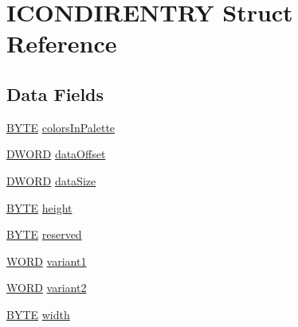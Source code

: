 \hypertarget{struct_i_c_o_n_d_i_r_e_n_t_r_y}{\section{I\-C\-O\-N\-D\-I\-R\-E\-N\-T\-R\-Y Struct Reference}
\label{struct_i_c_o_n_d_i_r_e_n_t_r_y}
}
\subsection*{Data Fields}
\begin{DoxyCompactItemize}
\item 
\hyperlink{il__bmp_8c_ab1926a007088a95f3b4f8b9baf01743f}{B\-Y\-T\-E} \hyperlink{struct_i_c_o_n_d_i_r_e_n_t_r_y_a4f291ed34428ce7b514486c736a6ae91}{colors\-In\-Palette}
\item 
\hyperlink{il__bmp_8c_a3f4629c2670b222c5d739cae794db89f}{D\-W\-O\-R\-D} \hyperlink{struct_i_c_o_n_d_i_r_e_n_t_r_y_accd9fd9f06d89d6a3a6a3a868f2d6096}{data\-Offset}
\item 
\hyperlink{il__bmp_8c_a3f4629c2670b222c5d739cae794db89f}{D\-W\-O\-R\-D} \hyperlink{struct_i_c_o_n_d_i_r_e_n_t_r_y_a01a26d635581219ca34d6c7988ee071a}{data\-Size}
\item 
\hyperlink{il__bmp_8c_ab1926a007088a95f3b4f8b9baf01743f}{B\-Y\-T\-E} \hyperlink{struct_i_c_o_n_d_i_r_e_n_t_r_y_aa2c6627098c28707127001fca1d3cc4b}{height}
\item 
\hyperlink{il__bmp_8c_ab1926a007088a95f3b4f8b9baf01743f}{B\-Y\-T\-E} \hyperlink{struct_i_c_o_n_d_i_r_e_n_t_r_y_a32acc012851fc2bad318c8a2e590bc75}{reserved}
\item 
\hyperlink{il__bmp_8c_a7463aadbea827602ea34f0d93509fa30}{W\-O\-R\-D} \hyperlink{struct_i_c_o_n_d_i_r_e_n_t_r_y_a91e0635e8d3f24a3701962cb0e773f73}{variant1}
\item 
\hyperlink{il__bmp_8c_a7463aadbea827602ea34f0d93509fa30}{W\-O\-R\-D} \hyperlink{struct_i_c_o_n_d_i_r_e_n_t_r_y_acef2b67a0cc8e94ec1c5514d71cee6ab}{variant2}
\item 
\hyperlink{il__bmp_8c_ab1926a007088a95f3b4f8b9baf01743f}{B\-Y\-T\-E} \hyperlink{struct_i_c_o_n_d_i_r_e_n_t_r_y_ad471bc246135d293139a6d1615727c48}{width}
\end{DoxyCompactItemize}


